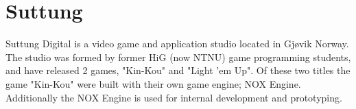 \section{Suttung}
Suttung Digital is a video game and application studio located in Gjøvik Norway.
The studio was formed by former HiG (now NTNU) game programming students,
and have released 2 games, "Kin-Kou" and "Light 'em Up".
Of these two titles the game "Kin-Kou" were built with their own game engine; NOX Engine.
Additionally the NOX Engine is used for internal development and prototyping.

